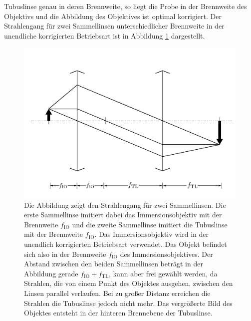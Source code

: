 \documentclass[titlepage,  ngerman]{article}
\begin{document}
Tubuslinse genau in deren Brennweite, so liegt die Probe in der Brennweite des Objektivs und die Abbildung des Objektives ist optimal korrigiert.\cite{Kuhl.2018} Der Strahlengang für zwei Sammellinsen unterschiedlicher Brennweite in der unendliche korrigierten Betriebsart ist in Abbildung \ref{fig:bildentstehungobjektiv} dargestellt.
	\begin{figure}[h]
		\centering
		\includegraphics[width=0.7\linewidth]{figures/BildentstehungObjektiv.pdf}
		\caption[Strahlengang unendlich korrigiertes Objektiv]{Die Abbildung zeigt den Strahlengang für zwei Sammellinsen. Die erste Sammellinse imitiert dabei das Immersionsobjektiv mit der Brennweite $f_\mathrm{IO}$ und die zweite Sammellinse imitiert die Tubuslinse mit der Brennweite $f_\mathrm{IO}$. Das Immersionsobjektiv wird in der unendlich korrigierten Betriebsart verwendet. Das Objekt befindet sich also in der Brennweite $f_\mathrm{IO}$ des Immersionsobjektives. Der Abstand zwischen den beiden Sammellinsen beträgt in der Abbildung gerade $f_\mathrm{IO} + f_\mathrm{TL}$, kann aber frei gewählt werden, da Strahlen, die von einem Punkt des Objektes ausgehen, zwischen den Linsen parallel verlaufen. Bei zu großer Distanz erreichen die Strahlen die Tubuslinse jedoch nicht mehr. Das vergrößerte Bild des Objektes entsteht in der hinteren Brennebene der Tubuslinse.}
		\label{fig:bildentstehungobjektiv}
	\end{figure}
	
\end{document}
